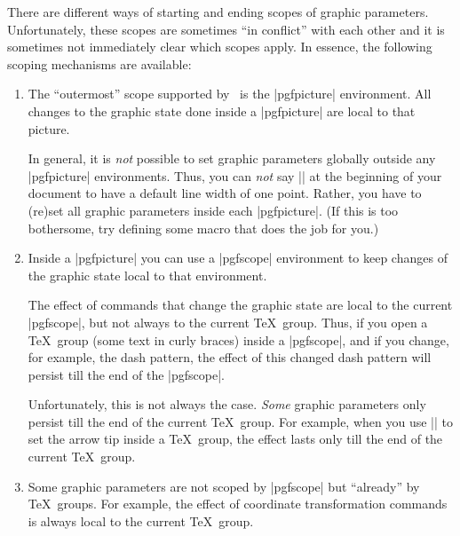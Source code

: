 There are different ways of starting and ending scopes of graphic parameters.
Unfortunately, these scopes are sometimes ``in conflict'' with each other and
it is sometimes not immediately clear which scopes apply. In essence, the
following scoping mechanisms are available:
%
\begin{enumerate}
    \item The ``outermost'' scope supported by \pgfname\ is the |{pgfpicture}|
        environment. All changes to the graphic state done inside a
        |{pgfpicture}| are local to that picture.

        In general, it is \emph{not} possible to set graphic parameters
        globally outside any |{pgfpicture}| environments. Thus, you can
        \emph{not} say |\pgfsetlinewidth{1pt}| at the beginning of your
        document to have a default line width of one point. Rather, you have to
        (re)set all graphic parameters inside each |{pgfpicture}|. (If this is
        too bothersome, try defining some macro that does the job for you.)
    \item Inside a |{pgfpicture}| you can use a |{pgfscope}| environment to
        keep changes of the graphic state local to that environment.

        The effect of commands that change the graphic state are local to the
        current |{pgfscope}|, but not always to the current \TeX\ group. Thus,
        if you open a \TeX\ group (some text in curly braces) inside a
        |{pgfscope}|, and if you change, for example, the dash pattern, the
        effect of this changed dash pattern will persist till the end of the
        |{pgfscope}|.

        Unfortunately, this is not always the case. \emph{Some} graphic
        parameters only persist till the end of the current \TeX\ group. For
        example, when you use |\pgfsetarrows| to set the arrow tip inside a
        \TeX\ group, the effect lasts only till the end of the current \TeX\
        group.
    \item Some graphic parameters are not scoped by |{pgfscope}| but
        ``already'' by \TeX\ groups. For example, the effect of coordinate
        transformation commands is always local to the current \TeX\ group.


\end{enumerate}
